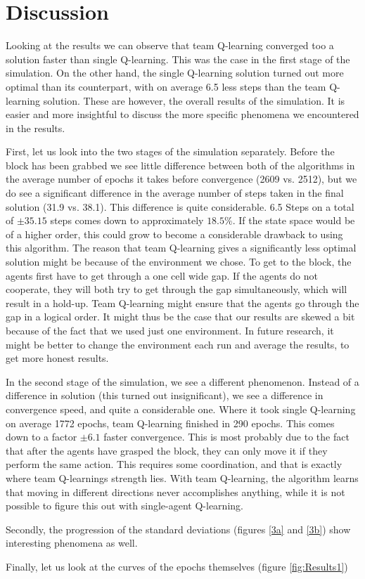 \section{Discussion}
Looking at the results we can observe that team Q-learning converged too a solution faster than single Q-learning. This was the case in the first stage of the simulation. On the other hand, the single Q-learning solution turned out more optimal than its counterpart, with on average 6.5 less steps than the team Q-learning solution. These are however, the overall results of the simulation. It is easier and more insightful to discuss the more specific phenomena we encountered in the results.

First, let us look into the two stages of the simulation separately. Before the block has been grabbed we see little difference between both of the algorithms in the average number of epochs it takes before convergence (2609 vs. 2512), but we do see a significant difference in the average number of steps taken in the final solution (31.9 vs. 38.1). This difference is quite considerable. 6.5 Steps on a total of $\pm 35.15$ steps comes down to approximately $18.5\%$. If the state space would be of a higher order, this could grow to become a considerable drawback to using this algorithm. The reason that team Q-learning gives a significantly less optimal solution might be because of the environment we chose. To get to the block, the agents first have to get through a one cell wide gap. If the agents do not cooperate, they will both try to get through the gap simultaneously, which will result in a hold-up. Team Q-learning might ensure that the agents go through the gap in a logical order. It might thus be the case that our results are skewed a bit because of the fact that we used just one environment. In future research, it might be better to change the environment each run and average the results, to get more honest results.

In the second stage of the simulation, we see a different phenomenon. Instead of a difference in solution (this turned out insignificant), we see a difference in convergence speed, and quite a considerable one. Where it took single Q-learning on average 1772 epochs, team Q-learning finished in 290 epochs. This comes down to a factor $\pm 6.1$ faster convergence. This is most probably due to the fact that after the agents have grasped the block, they can only move it if they perform the same action. This requires some coordination, and that is exactly where team Q-learnings strength lies. With team Q-learning, the algorithm learns that moving in different directions never accomplishes anything, while it is not possible to figure this out with single-agent Q-learning.

Secondly, the progression of the standard deviations (figures \ref{3a} and \ref{3b}) show interesting phenomena as well.

Finally, let us look at the curves of the epochs themselves (figure \ref{fig:Results1})